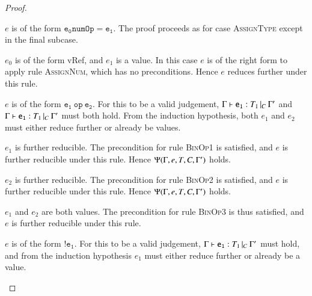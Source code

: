 \begin{proof}
\begin{case}[AssignTypeUndef]
  \end{case}

  \begin{case}[NumAssignType]\label{case:prog-numassigntype}

  	$e$ is of the form $\mathtt{e_0 numOp= e_1}$. The proof proceeds as for case
  	\textsc{AssignType} except in the final subcase. 

  	\begin{subcase}
	  $e_0$ is of the form vRef, and $e_1$ is a value.
	  In this case $e$ is of the right form to apply rule \textsc{AssignNum},
	  which has no preconditions. Hence $e$ reduces further under this rule.
  	\end{subcase}

  \end{case}

  \begin{case}\label{case:prog-binoptype}

  	$e$ is of the form $\mathtt{e_1\ op\ e_2}$. For this to be a valid
  	judgement, $\Gamma{}\vdash\mathtt{e_1}: T_1\,|_C\:\Gamma'$ and $\Gamma{}\vdash\mathtt{e_1}: T_1\,|_C\:\Gamma'$ must both hold. From
  	the induction hypothesis, both $e_1$ and $e_2$ must either reduce further
  	or already be values.

  	\begin{subcase}
  	  $e_1$ is further reducible.
  	  The precondition for rule \textsc{BinOp1} is
  	  satisfied, and $e$ is further reducible under this rule. Hence
  	  $\Psi(\Gamma, e, T, C, \Gamma')$ holds.
 	\end{subcase}

  	\begin{subcase}
  	  $e_2$ is further reducible.
  	  The precondition for rule \textsc{BinOp2} is
  	  satisfied, and $e$ is further reducible under this rule. Hence
  	  $\Psi(\Gamma, e, T, C, \Gamma')$ holds.
 	\end{subcase}

	\begin{subcase}
	  $e_1$ and $e_2$ are both values. 
	  The precondition for rule \textsc{BinOp3} is thus satisfied, and $e$ is
	  further reducible under this rule.
	\end{subcase}
  \end{case}

  \begin{case}[NegType]\label{case:prog-negtype}

	$e$ is of the form $\mathtt{!e_1}$. For this to be a valid judgement,
	$\Gamma{}\vdash\mathtt{e_1}: T_1\,|_C\:\Gamma'$ must hold, and from the induction hypothesis $e_1$ must
	either reduce further or already be a value.


\end{case}
\end{proof}
